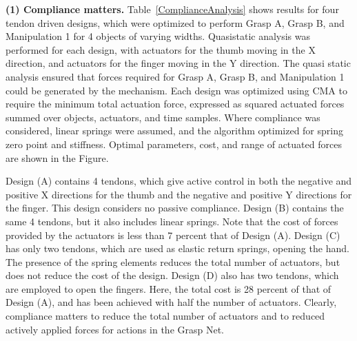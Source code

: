 \smallskip\noindent
{\bf (1) Compliance matters.}  Table~\ref{ComplianceAnalysis} shows results for four tendon driven designs, which were optimized to perform Grasp A, Grasp B, and Manipulation 1 for 4 objects of varying widths.   Quasistatic analysis was performed for each design, with actuators for the thumb moving in the X direction, and actuators for the finger moving in the Y direction.  The quasi static analysis ensured that forces required for Grasp A, Grasp B, and Manipulation 1 could be generated by the mechanism.   Each design was optimized using CMA \cite{hansen2006cma} to require the minimum total actuation force, expressed as squared actuated forces summed over objects, actuators, and time samples.    Where compliance was considered, linear springs were assumed, and the algorithm optimized for spring zero point and stiffness.   Optimal parameters, cost, and range of actuated forces are shown in the Figure.

Design (A) contains 4 tendons, which give active control in both the negative and positive X directions for the thumb and the negative and positive Y directions for the finger.   This design considers no passive compliance.   Design (B) contains the same 4 tendons, but it also includes linear springs.   Note that the cost of forces provided by the actuators is less than 7 percent that of Design (A).    Design (C) has only two tendons, which are used as elastic return springs, opening the hand.    The presence of the spring elements reduces the total number of actuators, but does not reduce the cost of the design.    Design (D) also has two tendons, which are employed to open the fingers.    Here, the total cost is 28 percent of that of Design (A), and has been achieved with half the number of actuators.    Clearly, compliance matters to reduce the total number of actuators and to reduced actively applied forces for actions in the Grasp Net.

